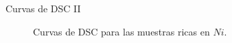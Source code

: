 \documentclass[11pt]{beamer}
\begin{document}
			\begin{frame}{Curvas de DSC II}
				\begin{figure}[H]
				\captionsetup[subfloat]{labelformat=empty}
					\caption*{Curvas de DSC para las muestras ricas en $Ni$.}
				\end{figure}	
			\end{frame}
		
\end{document}
